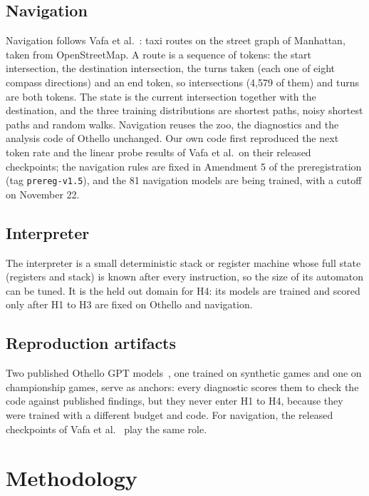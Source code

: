 \documentclass[11pt]{scrartcl}
\begin{document}
\subsection{Navigation}
Navigation follows Vafa et al.~\cite{vafa2024evaluating}: taxi routes on the street graph of Manhattan, taken
from OpenStreetMap. A route is a sequence of tokens: the start intersection, the destination intersection, the
turns taken (each one of eight compass directions) and an end token, so intersections (4,579 of them) and turns
are both tokens. The state is the current intersection together with the destination, and the three training
distributions are shortest paths, noisy shortest paths and random walks. Navigation reuses the zoo, the
diagnostics and the analysis code of Othello unchanged. Our own code first reproduced the next token rate and the
linear probe results of Vafa et al.\ on their released checkpoints; the navigation rules are fixed in Amendment 5
of the preregistration (tag \texttt{prereg-v1.5}), and the 81 navigation models are being trained, with a cutoff
on November 22.

\subsection{Interpreter}
The interpreter is a small deterministic stack or register machine whose full state (registers and stack) is
known after every instruction, so the size of its automaton can be tuned. It is the held out domain for H4:
its models are trained and scored only after H1 to H3 are fixed on Othello and navigation.

\subsection{Reproduction artifacts}
Two published Othello GPT models~\cite{li2023othello}, one trained on synthetic games and one on championship
games, serve as anchors: every diagnostic scores them to check the code against published findings, but they
never enter H1 to H4, because they were trained with a different budget and code. For navigation, the
released checkpoints of Vafa et al.~\cite{vafa2024evaluating} play the same role.

\section{Methodology}
\label{sec:method}
\end{document}
